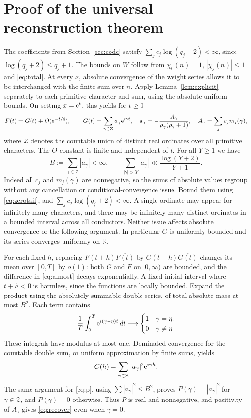 \documentclass[11pt]{article}
\theoremstyle{remark}\newtheorem{remark}[theorem]{Remark}
\newcommand{\R}{\mathbb R}\newcommand{\C}{\mathbb C}\newcommand{\N}{\mathbb N}\newcommand{\Z}{\mathbb Z}\newcommand{\Q}{\mathbb Q}
\begin{document}
\section{Proof of the universal reconstruction theorem}
The coefficients from Section~\ref{sec:code} satisfy $\sum_j c_j\log(q_j+2)<\infty$, since $\log(q_j+2)\le q_j+1$. The bounds on $W$ follow from $\chi_0(n)=1$, $|\chi_j(n)|\le1$ and \eqref{eq:total}. At every $x$, absolute convergence of the weight series allows it to be interchanged with the finite sum over $n$. Apply Lemma~\ref{lem:explicit} separately to each primitive character and sum, using the absolute uniform bounds. On setting $x=\mathrm e^t$, this yields for $t\ge0$
\begin{equation}\label{eq:almost}
F(t)=G(t)+O(\mathrm e^{-t/4}),\qquad
G(t)=\sum_{\gamma\in\mathcal Z} a_\gamma \mathrm e^{i\gamma t},\quad
a_\gamma=-\frac{A_\gamma}{\rho_\gamma(\rho_\gamma+1)},\quad
A_\gamma=\sum_j c_jm_j(\gamma),
\end{equation}
where $\mathcal Z$ denotes the countable union of distinct real ordinates over all primitive characters. The $O$-constant is finite and independent of $t$. For all $Y\ge1$ we have
\begin{equation}\label{eq:sumtail}
B:=\sum_{\gamma\in\mathcal Z}|a_\gamma|<\infty,\qquad
\sum_{|\gamma|>Y}|a_\gamma|\ll\frac{\log(Y+2)}{Y+1}.
\end{equation}
Indeed all $c_j$ and $m_j(\gamma)$ are nonnegative, so the sums of absolute values regroup without any cancellation or conditional-convergence issue. Bound them using \eqref{eq:zerotail}, and $\sum_jc_j\log(q_j+2)<\infty$. A single ordinate may appear for infinitely many characters, and there may be infinitely many distinct ordinates in a bounded interval across all conductors. Neither issue affects absolute convergence or the following argument. In particular $G$ is uniformly bounded and its series converges uniformly on $\R$.

For each fixed $h$, replacing $F(t+h)\overline{F(t)}$ by $G(t+h)\overline{G(t)}$ changes its mean over $[0,T]$ by $o(1)$: both $G$ and $F$ on $[0,\infty)$ are bounded, and the difference in \eqref{eq:almost} decays exponentially. A fixed initial interval where $t+h<0$ is harmless, since the functions are locally bounded. Expand the product using the absolutely summable double series, of total absolute mass at most $B^2$. Each term contains
\[
\frac1T\int_0^T\mathrm e^{i(\gamma-\eta)t}\,dt\longrightarrow
\begin{cases}1&\gamma=\eta,\\0&\gamma\ne\eta.\end{cases}
\]
These integrals have modulus at most one. Dominated convergence for the countable double sum, or uniform approximation by finite sums, yields
\begin{equation}\label{eq:correlation}
C(h)=\sum_{\gamma\in\mathcal Z}|a_\gamma|^2\mathrm e^{i\gamma h}.
\end{equation}
The same argument for \eqref{eq:p}, using $\sum|a_\gamma|^2\le B^2$, proves $P(\gamma)=|a_\gamma|^2$ for $\gamma\in\mathcal Z$, and $P(\gamma)=0$ otherwise. Thus $P$ is real and nonnegative, and positivity of $A_\gamma$ gives \eqref{eq:recover} even when $\gamma=0$.
\end{document}

